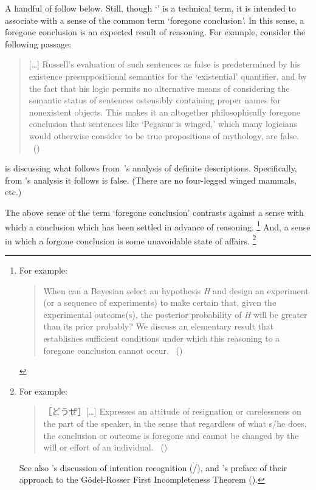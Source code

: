 \begin{note}
  A handful of  follow below.
  Still, though `' is a technical term, it is intended to associate with a sense of the common term `foregone conclusion'.
  In this sense, a foregone conclusion is an expected result of reasoning.
  For example, consider the following passage:

  \begin{quote}
    [\dots] Russell's evaluation of such sentences as false is predetermined by his existence presuppositional semantics for the ‘existential' quantifier, and by the fact that his logic permits no alternative means of considering the semantic status of sentences ostensibly containing proper names for nonexistent objects.
    This makes it an altogether philosophically foregone conclusion that sentences like ‘Pegasus is winged,' which many logicians would otherwise consider to be true propositions of mythology, are false.\newline
    \mbox{ }\hfill\mbox{(\cite[6]{Jacquette:2002up})}
  \end{quote}

  \noindent \citeauthor{Jacquette:2002up} is discussing what follows from~\citeauthor{Russell:1905aa}'s analysis of definite descriptions.
  Specifically, from \citeauthor{Russell:1905aa}'s analysis it follows  is false.
  (There are no four-legged winged mammals, etc.)

  The above sense of the term `foregone conclusion' contrasts against a sense with which a conclusion which has been settled in advance of reasoning.%
  \footnote{
    For example:
    \begin{quote}
      When can a Bayesian select an hypothesis \emph{H} and design an experiment (or a sequence of experiments) to make certain that, given the experimental outcome(s), the posterior probability of \emph{H} will be greater than its prior probably?
      We discuss an elementary result that establishes sufficient conditions under which this reasoning to a foregone conclusion cannot occur.%
      \mbox{ }\hfill\mbox{(\cite[1228]{Kadane:1996vu})}
    \end{quote}
  }
  And, a sense in which a forgone conclusion is some unavoidable state of affairs.%
  \footnote{
    For example:
    \begin{quote}
      ［どうぜ］[\dots] Expresses an attitude of resignation or carelessness on the part of the speaker, in the sense that regardless of what s/he does, the conclusion or outcome is foregone and cannot be changed by the will or effort of an individual.%
      \mbox{ }\hfill\mbox{(\cite[332--333]{kurufushamashii:2015un})}
    \end{quote}
    See also \citeauthor{Grice:1957vg}'s discussion of intention recognition (\citeyear[385]{Grice:1957vg}/\citeyear[219]{Grice:1989uf}), and \citeauthor{Machover:1996vu}'s preface of their approach to the G\"{o}del-Rosser First Incompleteness Theorem (\citeyear[viii]{Machover:1996vu}).
  }


\end{note}
